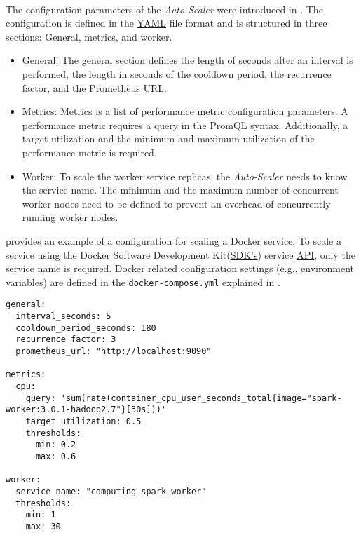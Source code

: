 \paragraph{}
The configuration parameters of the \textit{Auto-Scaler} were introduced in .
The configuration is defined in the \hyperlink{abbr:yaml}{YAML} file format and is structured in three sections: General, metrics, and worker.
\begin{itemize}
\item General:
The general section defines the length of seconds after an interval is performed, the length in seconds of the cooldown period, the recurrence factor, and the Prometheus \hyperlink{abbr:url}{URL}.

\item Metrics:
Metrics is a list of performance metric configuration parameters. A performance metric requires a query in the PromQL syntax. Additionally, a target utilization and the minimum and maximum utilization of the performance metric is required.

\item Worker:
To scale the worker service replicas, the \textit{Auto-Scaler} needs to know the service name. The minimum and the maximum number of concurrent worker nodes need to be defined to prevent an overhead of concurrently running worker nodes.
\end{itemize}
 provides an example of a configuration for scaling a Docker service.
%
To scale a service using the Docker Software Development Kit(\hyperlink{abbr:sdk}{SDK's}) service \hyperlink{abbr:api}{API}, only the service name is required.
%
Docker related configuration settings (e.g., environment variables) are defined in the \texttt{docker-compose.yml} explained in .
\begin{lstlisting}[label=lst:06_auto-scaler_config_service_example, caption=\textit{Auto-Scaler} configuration for scaling Docker Services]
general:
  interval_seconds: 5
  cooldown_period_seconds: 180
  recurrence_factor: 3
  prometheus_url: "http://localhost:9090"
 
metrics:
  cpu:
    query: 'sum(rate(container_cpu_user_seconds_total{image="spark-worker:3.0.1-hadoop2.7"}[30s]))'
    target_utilization: 0.5
    thresholds:
      min: 0.2
      max: 0.6
 
worker:
  service_name: "computing_spark-worker"
  thresholds:
    min: 1
    max: 30
\end{lstlisting}


